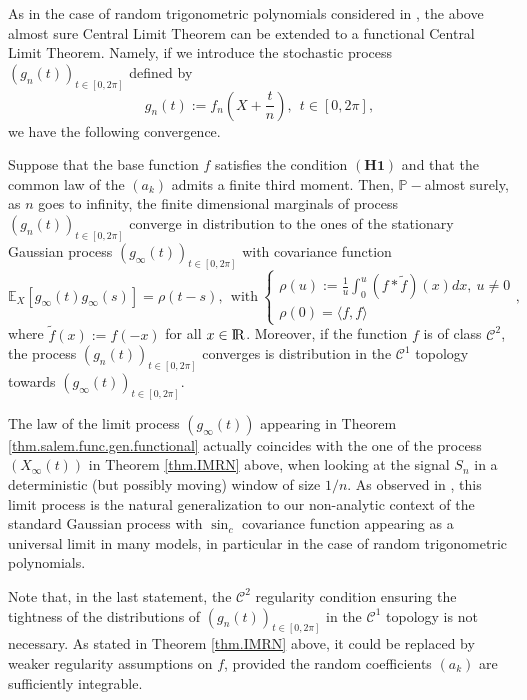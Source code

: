 \documentclass{svproc}
\newcommand{\Prob}{\mathbb{P}}
\newcommand \Esp {\mathbb{E}}
\def\R{{\rm I\kern-0.16em R}}
\begin{document}
As in the case of random trigonometric polynomials considered in \cite{AP21}, the above almost sure Central Limit Theorem can be extended to a functional Central Limit Theorem. 
Namely, if we introduce the stochastic process $(g_{n}(t))_{t\in[0,2\pi]}$ defined by
$$g_n(t):=f_n\left(X+\frac{t}{n}\right),~~t\in [0,2\pi],$$
we have the following convergence.

\begin{theorem}\label{thm.salem.func.gen.functional}Suppose that the base function $f$ satisfies the condition $\mathbf{(H1)}$ and that the common law of the $(a_k)$ admits a finite third moment. Then, $\Prob-$almost surely, as $n$ goes to infinity, the finite dimensional marginals of process $(g_{n}(t))_{t\in[0,2\pi]}$ converge in distribution  to the ones of the stationary Gaussian process $(g_{\infty}(t))_{t\in[0,2\pi]}$ with covariance function
$$\Esp_X[g_{\infty}(t)g_{\infty}(s)] = \rho(t-s),~~\text{with}~\left\{\begin{array}{l}\displaystyle \rho(u):=\frac{1}{u}\int_0^{u}(f\ast \widetilde{f})(x)dx,~u\neq 0 \\\rho(0)=\langle f,f \rangle\end{array}\right.,$$
where $\widetilde{f}(x):=f(-x)$ for all $x\in \R$. Moreover, if the function $f$ is of class $\mathcal C^2$, the process $(g_{n}(t))_{t\in[0,2\pi]}$ converges is distribution in the $\mathcal{C}^1$ topology towards $(g_{\infty}(t))_{t\in[0,2\pi]}$.
\end{theorem}

\begin{remark}
The law of the limit process $(g_{\infty}(t))$ appearing in Theorem \ref{thm.salem.func.gen.functional} actually coincides with the one of the process $(X_{\infty}(t))$ in Theorem \ref{thm.IMRN} above, when looking at the signal $S_n$ in a deterministic (but possibly moving) window of size $1/n$. As observed in \cite{AP20IMRN}, this limit process is the natural generalization to our non-analytic context of the standard Gaussian process with $\sin_c$ covariance function appearing as a universal limit in many models, in particular in the case of random trigonometric polynomials. 
\end{remark}

\begin{remark}
Note that, in the last statement, the $\mathcal C^2$ regularity condition ensuring the tightness of the distributions of $(g_{n}(t))_{t\in[0,2\pi]}$ in the $\mathcal C^1$ topology is not necessary. As stated in Theorem \ref{thm.IMRN} above, it could be replaced by weaker regularity assumptions on $f$, provided the random coefficients $(a_k)$ are sufficiently integrable. 
\end{remark}
\end{document}
